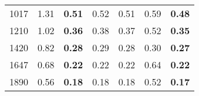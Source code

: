 \begin{table}
{\begin{tabular}{|l||r|rrr||rr|}
1017   &           1.31 &    \textbf{ 0.51} &          0.52 &         0.51 &       0.59 &           \textbf{0.48} \\
1210   &           1.02 &    \textbf{ 0.36} &          0.38 &         0.37 &       0.52 &           \textbf{0.35} \\
1420   &           0.82 &    \textbf{ 0.28} &          0.29 &         0.28 &       0.30 &           \textbf{0.27} \\
1647   &           0.68 &    \textbf{ 0.22} &          0.22 &         0.22 &       0.64 &           \textbf{0.22} \\
1890   &           0.56 &    \textbf{ 0.18} &          0.18 &         0.18 &       0.52 &           \textbf{0.17} \\
\bottomrule
\end{tabular}%
}
\end{table}
